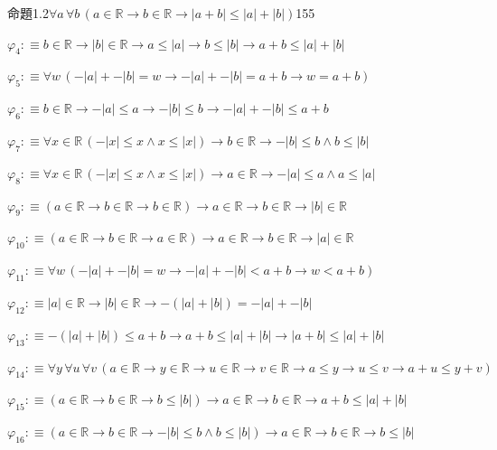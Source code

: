 \begin{fullproof}{命題1.2}{$\forall a\,\forall b\,(a \in \mathbb{R} \to b \in \mathbb{R} \to \lvert a + b \rvert \leq \lvert a \rvert + \lvert b \rvert)$}{155}
\begin{abbrevlist}
\item $\varphi_{4} :\equiv b \in \mathbb{R} \to \lvert b \rvert \in \mathbb{R} \to a \leq \lvert a \rvert \to b \leq \lvert b \rvert \to a + b \leq \lvert a \rvert + \lvert b \rvert$
\item $\varphi_{5} :\equiv \forall w\,(-\lvert a \rvert + -\lvert b \rvert = w \to -\lvert a \rvert + -\lvert b \rvert = a + b \to w = a + b)$
\item $\varphi_{6} :\equiv b \in \mathbb{R} \to -\lvert a \rvert \leq a \to -\lvert b \rvert \leq b \to -\lvert a \rvert + -\lvert b \rvert \leq a + b$
\item $\varphi_{7} :\equiv \forall x \in \mathbb{R}\,(-\lvert x \rvert \leq x \land x \leq \lvert x \rvert) \to b \in \mathbb{R} \to -\lvert b \rvert \leq b \land b \leq \lvert b \rvert$
\item $\varphi_{8} :\equiv \forall x \in \mathbb{R}\,(-\lvert x \rvert \leq x \land x \leq \lvert x \rvert) \to a \in \mathbb{R} \to -\lvert a \rvert \leq a \land a \leq \lvert a \rvert$
\item $\varphi_{9} :\equiv (a \in \mathbb{R} \to b \in \mathbb{R} \to b \in \mathbb{R}) \to a \in \mathbb{R} \to b \in \mathbb{R} \to \lvert b \rvert \in \mathbb{R}$
\item $\varphi_{10} :\equiv (a \in \mathbb{R} \to b \in \mathbb{R} \to a \in \mathbb{R}) \to a \in \mathbb{R} \to b \in \mathbb{R} \to \lvert a \rvert \in \mathbb{R}$
\item $\varphi_{11} :\equiv \forall w\,(-\lvert a \rvert + -\lvert b \rvert = w \to -\lvert a \rvert + -\lvert b \rvert < a + b \to w < a + b)$
\item $\varphi_{12} :\equiv \lvert a \rvert \in \mathbb{R} \to \lvert b \rvert \in \mathbb{R} \to -(\lvert a \rvert + \lvert b \rvert) = -\lvert a \rvert + -\lvert b \rvert$
\item $\varphi_{13} :\equiv -(\lvert a \rvert + \lvert b \rvert) \leq a + b \to a + b \leq \lvert a \rvert + \lvert b \rvert \to \lvert a + b \rvert \leq \lvert a \rvert + \lvert b \rvert$
\item $\varphi_{14} :\equiv \forall y\,\forall u\,\forall v\,(a \in \mathbb{R} \to y \in \mathbb{R} \to u \in \mathbb{R} \to v \in \mathbb{R} \to a \leq y \to u \leq v \to a + u \leq y + v)$
\item $\varphi_{15} :\equiv (a \in \mathbb{R} \to b \in \mathbb{R} \to b \leq \lvert b \rvert) \to a \in \mathbb{R} \to b \in \mathbb{R} \to a + b \leq \lvert a \rvert + \lvert b \rvert$
\item $\varphi_{16} :\equiv (a \in \mathbb{R} \to b \in \mathbb{R} \to -\lvert b \rvert \leq b \land b \leq \lvert b \rvert) \to a \in \mathbb{R} \to b \in \mathbb{R} \to b \leq \lvert b \rvert$

\end{abbrevlist}
\end{fullproof}
